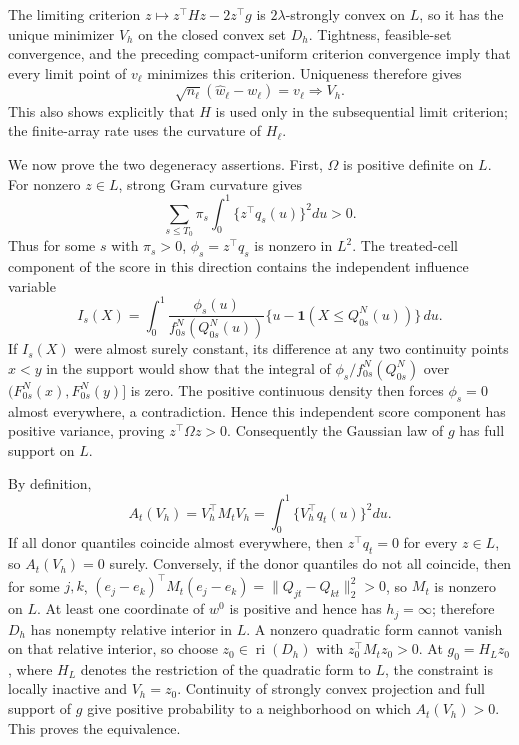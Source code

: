 The limiting criterion \(z\mapsto z^\top Hz-2z^\top g\) is \(2\lambda\)-strongly convex on \(L\), so it has the unique minimizer \(V_h\) on the closed convex set \(D_h\).  Tightness, feasible-set convergence, and the preceding compact-uniform criterion convergence imply that every limit point of \(v_\ell\) minimizes this criterion.  Uniqueness therefore gives
\[
 \sqrt{n_\ell}(\widehat w_\ell-w_\ell)=v_\ell\Rightarrow V_h.
\]
This also shows explicitly that \(H\) is used only in the subsequential limit criterion; the finite-array rate uses the curvature of \(H_\ell\).

We now prove the two degeneracy assertions.  First, \(\Omega\) is positive definite on \(L\).  For nonzero \(z\in L\), strong Gram curvature gives
\[
 \sum_{s\leq T_0}\pi_s\int_0^1\{z^\top q_s(u)\}^2du>0.
\]
Thus for some \(s\) with \(\pi_s>0\), \(\phi_s=z^\top q_s\) is nonzero in \(L^2\).  The treated-cell component of the score in this direction contains the independent influence variable
\[
 I_s(X)=\int_0^1\frac{\phi_s(u)}{f^N_{0s}(Q^N_{0s}(u))}
       \{u-\mathbf 1(X\leq Q^N_{0s}(u))\}\,du.
\]
If \(I_s(X)\) were almost surely constant, its difference at any two continuity points \(x<y\) in the support would show that the integral of \(\phi_s/f^N_{0s}(Q^N_{0s})\) over \((F^N_{0s}(x),F^N_{0s}(y)]\) is zero.  The positive continuous density then forces \(\phi_s=0\) almost everywhere, a contradiction.  Hence this independent score component has positive variance, proving \(z^\top\Omega z>0\).  Consequently the Gaussian law of \(g\) has full support on \(L\).

By definition,
\[
 A_t(V_h)=V_h^\top M_tV_h
 =\int_0^1\{V_h^\top q_t(u)\}^2du.
\]
If all donor quantiles coincide almost everywhere, then \(z^\top q_t=0\) for every \(z\in L\), so \(A_t(V_h)=0\) surely.  Conversely, if the donor quantiles do not all coincide, then for some \(j,k\),
\((e_j-e_k)^\top M_t(e_j-e_k)=\|Q_{jt}-Q_{kt}\|_2^2>0\), so \(M_t\) is nonzero on \(L\).  At least one coordinate of \(w^0\) is positive and hence has \(h_j=\infty\); therefore \(D_h\) has nonempty relative interior in \(L\).  A nonzero quadratic form cannot vanish on that relative interior, so choose \(z_0\in\operatorname{ri}(D_h)\) with \(z_0^\top M_tz_0>0\).  At \(g_0=H_Lz_0\), where \(H_L\) denotes the restriction of the quadratic form to \(L\), the constraint is locally inactive and \(V_h=z_0\).  Continuity of strongly convex projection and full support of \(g\) give positive probability to a neighborhood on which \(A_t(V_h)>0\).  This proves the equivalence.

